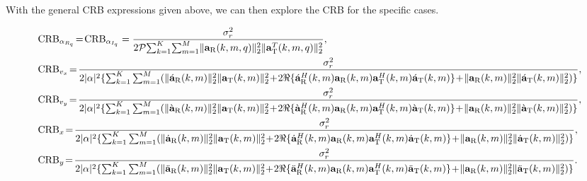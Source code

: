 \documentclass[9pt,final,journal,twocolumn]{IEEEtran}
\begin{document}
With the general CRB expressions given above, we can then explore the CRB for the specific cases. 

\begin{figure}[!t]
\begin{small}
\begin{subequations} \label{CRB_vel.q_single}
\begin{flalign}
&\mathrm{CRB}_{\alpha_{R_{q}}} \!=\!\mathrm{CRB}_{\alpha_{I_{q}}} =\frac{\sigma_r^2}{2\mathcal{P}{\sum}_{k=1}^K{\sum}_{m=1}^M\|{\bf a}_{\mathrm{R}}(k,m,q)\|_2^2\|{\bf a}_{\mathrm{T}}^{T}(k,m,q)\|_2^2},\\
 &\mathrm{CRB}_{v_{x}}\!=\! \frac{\sigma_r^2}{2|\alpha|^2\{\sum_{k=1}^K\sum_{m=1}^M    (\|\acute{\bf a}_{\mathrm R}(k,m)\|_2^2\|{\bf a}_{\mathrm T}(k,m)\|_2^2\!+\!2\Re{\{\acute{\bf a}_{\mathrm R}^H(k,m){\bf a}_{\mathrm R}(k,m)}{\bf a}_{\mathrm T}^H(k,m)\acute{\bf a}_{\mathrm T}(k,m)\}\!+\!\|{\bf a}_{\mathrm R}(k,m)\|_2^2\|\acute{\bf a}_{\mathrm T}(k,m)\|_2^2) \}},     \label{CRB_vel.q1_single}\\
 &\mathrm{CRB}_{v_{y}} \!=\!\frac{\sigma_r^2}{2|\alpha|^2\{\sum_{k=1}^K\sum_{m=1}^M    (\|\grave{\bf a}_{\mathrm R}(k,m)\|_2^2\|{\bf a}_{\mathrm T}(k,m)\|_2^2\!+\!2\Re{\{\grave{\bf a}_{\mathrm R}^H(k,m){\bf a}_{\mathrm R}(k,m)}{\bf a}_{\mathrm T}^H(k,m)\grave{\bf a}_{\mathrm T}(k,m)\}\!+\!\|{\bf a}_{\mathrm R}(k,m)\|_2^2\|\grave{\bf a}_{\mathrm T}(k,m)\|_2^2) \}}, \label{CRB_vel.q2_single} \\
 &\mathrm{CRB}_{x} \!=\! \frac{\sigma_r^2}{2|\alpha|^2\{\sum_{k=1}^K\sum_{m=1}^M    (\|\dot{\bf a}_{\mathrm R}(k,m)\|_2^2\|{\bf a}_{\mathrm T}(k,m)\|_2^2\!+\!2\Re{\{\dot{\bf a}_{\mathrm R}^H(k,m){\bf a}_{\mathrm R}(k,m)}{\bf a}_{\mathrm T}^H(k,m)\dot{\bf a}_{\mathrm T}(k,m)\}\!+\!\|{\bf a}_{\mathrm R}(k,m)\|_2^2\|\dot{\bf a}_{\mathrm T}(k,m)\|_2^2) \}},    \label{CRB_loc.q1_single}\\
 &\mathrm{CRB}_{y} \!=\!\frac{\sigma_r^2}{2|\alpha|^2\{\sum_{k=1}^K\sum_{m=1}^M    (\|\ddot{\bf a}_{\mathrm R}(k,m)\|_2^2\|{\bf a}_{\mathrm T}(k,m)\|_2^2\!+\!2\Re{\{\ddot{\bf a}_{\mathrm R}^H(k,m){\bf a}_{\mathrm R}(k,m)}{\bf a}_{\mathrm T}^H(k,m)\ddot{\bf a}_{\mathrm T}(k,m)\}\!+\!\|{\bf a}_{\mathrm R}(k,m)\|_2^2\|\ddot{\bf a}_{\mathrm T}(k,m)\|_2^2) \}}. \label{CRB_loc.q2_single}
\end{flalign}
\end{subequations}
\end{small}
\hrulefill
\end{figure}


\vspace{-0.2cm}
\end{document}
